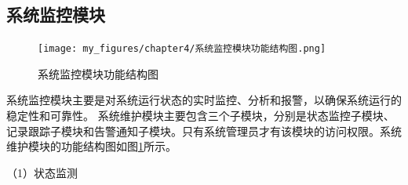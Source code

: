 




\subsection{系统监控模块}

\begin{figure}[h]
    \centering
    \texttt{[image: my\_figures/chapter4/系统监控模块功能结构图.png]}
    \caption{系统监控模块功能结构图}
    \label{fig:系统监控模块功能结构图}
\end{figure}

系统监控模块主要是对系统运行状态的实时监控、分析和报警，以确保系统运行的稳定性和可靠性。
系统维护模块主要包含三个子模块，分别是状态监控子模块、
记录跟踪子模块和告警通知子模块。只有系统管理员才有该模块的访问权限。系统维护模块的功能结构图如图\ref{fig:系统监控模块功能结构图}所示。


（1）状态监测



